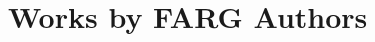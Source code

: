 \documentclass{article}
\begin{document}
\section*{Works by FARG Authors}
\nocite{*}




\end{document}
